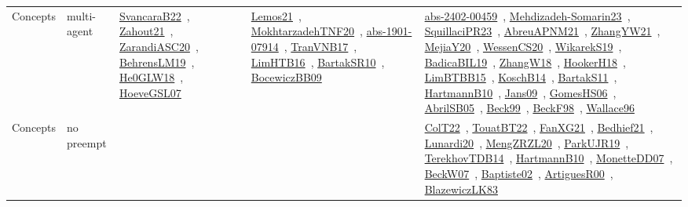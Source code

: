 {\begin{longtable}{lp{3cm}>{\raggedright\arraybackslash}p{6cm}>{\raggedright\arraybackslash}p{6cm}>{\raggedright\arraybackslash}p{8cm}}
Concepts & multi-agent & \href{works/SvancaraB22.pdf}{SvancaraB22}~\cite{SvancaraB22}, \href{works/Zahout21.pdf}{Zahout21}~\cite{Zahout21}, \href{works/ZarandiASC20.pdf}{ZarandiASC20}~\cite{ZarandiASC20}, \href{works/BehrensLM19.pdf}{BehrensLM19}~\cite{BehrensLM19}, \href{works/He0GLW18.pdf}{He0GLW18}~\cite{He0GLW18}, \href{works/HoeveGSL07.pdf}{HoeveGSL07}~\cite{HoeveGSL07} & \href{works/Lemos21.pdf}{Lemos21}~\cite{Lemos21}, \href{works/MokhtarzadehTNF20.pdf}{MokhtarzadehTNF20}~\cite{MokhtarzadehTNF20}, \href{works/abs-1901-07914.pdf}{abs-1901-07914}~\cite{abs-1901-07914}, \href{works/TranVNB17.pdf}{TranVNB17}~\cite{TranVNB17}, \href{works/LimHTB16.pdf}{LimHTB16}~\cite{LimHTB16}, \href{works/BartakSR10.pdf}{BartakSR10}~\cite{BartakSR10}, \href{works/BocewiczBB09.pdf}{BocewiczBB09}~\cite{BocewiczBB09} & \href{works/abs-2402-00459.pdf}{abs-2402-00459}~\cite{abs-2402-00459}, \href{works/Mehdizadeh-Somarin23.pdf}{Mehdizadeh-Somarin23}~\cite{Mehdizadeh-Somarin23}, \href{works/SquillaciPR23.pdf}{SquillaciPR23}~\cite{SquillaciPR23}, \href{works/AbreuAPNM21.pdf}{AbreuAPNM21}~\cite{AbreuAPNM21}, \href{works/ZhangYW21.pdf}{ZhangYW21}~\cite{ZhangYW21}, \href{works/MejiaY20.pdf}{MejiaY20}~\cite{MejiaY20}, \href{works/WessenCS20.pdf}{WessenCS20}~\cite{WessenCS20}, \href{works/WikarekS19.pdf}{WikarekS19}~\cite{WikarekS19}, \href{works/BadicaBIL19.pdf}{BadicaBIL19}~\cite{BadicaBIL19}, \href{works/ZhangW18.pdf}{ZhangW18}~\cite{ZhangW18}, \href{works/HookerH18.pdf}{HookerH18}~\cite{HookerH18}, \href{works/LimBTBB15.pdf}{LimBTBB15}~\cite{LimBTBB15}, \href{works/KoschB14.pdf}{KoschB14}~\cite{KoschB14}, \href{works/BartakS11.pdf}{BartakS11}~\cite{BartakS11}, \href{works/HartmannB10.pdf}{HartmannB10}~\cite{HartmannB10}, \href{works/Jans09.pdf}{Jans09}~\cite{Jans09}, \href{works/GomesHS06.pdf}{GomesHS06}~\cite{GomesHS06}, \href{works/AbrilSB05.pdf}{AbrilSB05}~\cite{AbrilSB05}, \href{works/Beck99.pdf}{Beck99}~\cite{Beck99}, \href{works/BeckF98.pdf}{BeckF98}~\cite{BeckF98}, \href{works/Wallace96.pdf}{Wallace96}~\cite{Wallace96}\\
Concepts & no preempt &  &  & \href{works/ColT22.pdf}{ColT22}~\cite{ColT22}, \href{works/TouatBT22.pdf}{TouatBT22}~\cite{TouatBT22}, \href{works/FanXG21.pdf}{FanXG21}~\cite{FanXG21}, \href{works/Bedhief21.pdf}{Bedhief21}~\cite{Bedhief21}, \href{works/Lunardi20.pdf}{Lunardi20}~\cite{Lunardi20}, \href{works/MengZRZL20.pdf}{MengZRZL20}~\cite{MengZRZL20}, \href{works/ParkUJR19.pdf}{ParkUJR19}~\cite{ParkUJR19}, \href{works/TerekhovTDB14.pdf}{TerekhovTDB14}~\cite{TerekhovTDB14}, \href{works/HartmannB10.pdf}{HartmannB10}~\cite{HartmannB10}, \href{works/MonetteDD07.pdf}{MonetteDD07}~\cite{MonetteDD07}, \href{works/BeckW07.pdf}{BeckW07}~\cite{BeckW07}, \href{works/Baptiste02.pdf}{Baptiste02}~\cite{Baptiste02}, \href{works/ArtiguesR00.pdf}{ArtiguesR00}~\cite{ArtiguesR00}, \href{works/BlazewiczLK83.pdf}{BlazewiczLK83}~\cite{BlazewiczLK83}\\

\end{longtable}}

